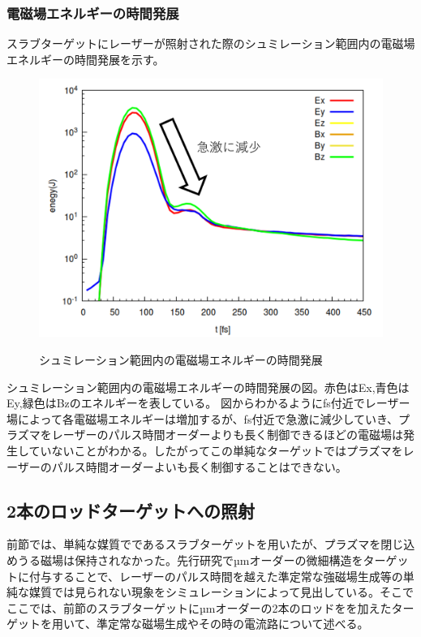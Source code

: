\documentclass[a4paper,11pt,titlepage]{jarticle}
\numberwithin{equation}{section} %
\begin{document}
\subsubsection{電磁場エネルギーの時間発展}
スラブターゲットにレーザーが照射された際のシュミレーション範囲内の電磁場エネルギーの時間発展を示す。

\begin{figure}[H]
  \begin{center}
    \includegraphics[scale=0.5]{./image/4-15-slab.png}
    \label{fig:4-4-2}
    \caption{シュミレーション範囲内の電磁場エネルギーの時間発展}
  \end{center}
\end{figure}

シュミレーション範囲内の電磁場エネルギーの時間発展の図。赤色はEx,青色はEy,緑色はBzのエネルギーを表している。
図からわかるようにfs付近でレーザー場によって各電磁場エネルギーは増加するが、fs付近で急激に減少していき、プラズマをレーザーのパルス時間オーダーよりも長く制御できるほどの電磁場は発生していないことがわかる。したがってこの単純なターゲットではプラズマをレーザーのパルス時間オーダーよいも長く制御することはできない。

\subsection{2本のロッドターゲットへの照射}
前節では、単純な媒質でであるスラブターゲットを用いたが、プラズマを閉じ込めうる磁場は保持されなかった。先行研究でµmオーダーの微細構造をターゲットに付与することで、レーザーのパルス時間を越えた準定常な強磁場生成等の単純な媒質では見られない現象をシミュレーションによって見出している。そこでここでは、前節のスラブターゲットにµmオーダーの2本のロッドをを加えたターゲットを用いて、準定常な磁場生成やその時の電流路について述べる。
\end{document}
